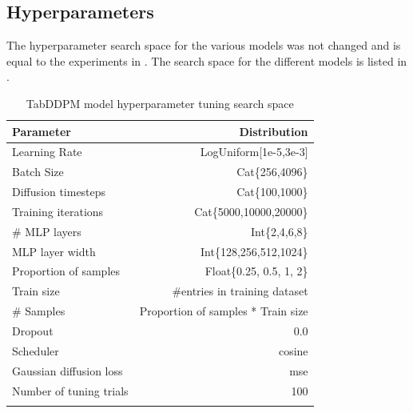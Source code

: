 \subsection{Hyperparameters}
The hyperparameter search space for the various models was not changed and is equal to the experiments in \cite{kotelnikov2022TabDDPMModellingTabular}.
The search space for the different models is listed in . 
\begin{table}[h]
	\centering
	\begin{tabular}{lr}
		\toprule
		Parameter               & Distribution                       \\
		\midrule
		Learning Rate           & LogUniform[1e-5,3e-3]              \\
		Batch Size              & Cat\{256,4096\}                    \\
		Diffusion timesteps     & Cat\{100,1000\}                    \\
		Training iterations     & Cat\{5000,10000,20000\}            \\
		\# MLP layers           & Int\{2,4,6,8\}                     \\
		MLP layer width         & Int\{128,256,512,1024\}            \\
		Proportion of samples   & Float\{0.25, 0.5, 1, 2\}           \\
		\midrule
		Train size              & \#entries in training dataset      \\
		\# Samples              & Proportion of samples * Train size \\
		Dropout                 & 0.0                                \\
		Scheduler               & cosine                             \\
		Gaussian diffusion loss & mse                                \\
		\midrule
		Number of tuning trials & 100                                \\
		\bottomrule
		\multicolumn{2}{c}{}\\[-0.6em]
	\end{tabular}
	\caption[TabDDPM Hyperparameter Search Space]{TabDDPM model hyperparameter tuning search space \cite{kotelnikov2022TabDDPMModellingTabular}}
	\label{tab:diff_tune}
\end{table}
\newpage

